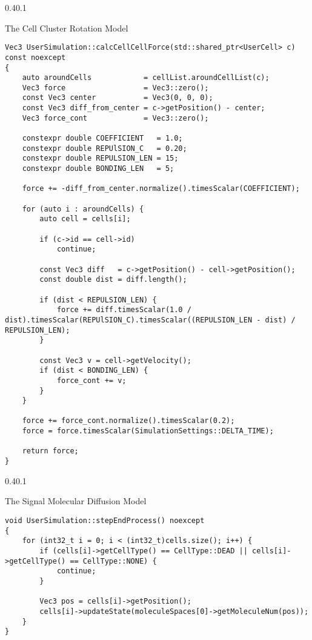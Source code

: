 \documentclass[vipdfmx,a4paper,11pt]{jsarticle}
\makeatletter
\renewcommand{\subsection}{%
  \@startsection{subsection}{1}{\z@}%
  {0.4\Cvs}{0.1\Cvs}%
  {\normalfont\large\headfont\raggedright}}
\renewcommand{\subsubsection}{%
  \@startsection{subsubsection}{1}{\z@}%
  {0.4\Cvs}{0.1\Cvs}%
  {\normalfont\large\headfont\raggedright}}
\makeatother
\begin{document}
\subsubsection{The Cell Cluster Rotation Model}
\begin{lstlisting}[caption=calcCellCellForce()]
Vec3 UserSimulation::calcCellCellForce(std::shared_ptr<UserCell> c) const noexcept
{
    auto aroundCells            = cellList.aroundCellList(c);
    Vec3 force                  = Vec3::zero();
    const Vec3 center           = Vec3(0, 0, 0);
    const Vec3 diff_from_center = c->getPosition() - center;
    Vec3 force_cont             = Vec3::zero();

    constexpr double COEFFICIENT   = 1.0;
    constexpr double REPUlSION_C   = 0.20;
    constexpr double REPULSION_LEN = 15;
    constexpr double BONDING_LEN   = 5;

    force += -diff_from_center.normalize().timesScalar(COEFFICIENT);

    for (auto i : aroundCells) {
        auto cell = cells[i];

        if (c->id == cell->id)
            continue;

        const Vec3 diff   = c->getPosition() - cell->getPosition();
        const double dist = diff.length();

        if (dist < REPULSION_LEN) {
            force += diff.timesScalar(1.0 / dist).timesScalar(REPUlSION_C).timesScalar((REPULSION_LEN - dist) / REPULSION_LEN);
        }

        const Vec3 v = cell->getVelocity();
        if (dist < BONDING_LEN) {
            force_cont += v;
        }
    }

    force += force_cont.normalize().timesScalar(0.2);
    force = force.timesScalar(SimulationSettings::DELTA_TIME);

    return force;
}
\end{lstlisting}

\subsection{The Signal Molecular Diffusion Model}
\begin{lstlisting}[caption=stepEndProcess()]
void UserSimulation::stepEndProcess() noexcept
{
    for (int32_t i = 0; i < (int32_t)cells.size(); i++) {
        if (cells[i]->getCellType() == CellType::DEAD || cells[i]->getCellType() == CellType::NONE) {
            continue;
        }

        Vec3 pos = cells[i]->getPosition();
        cells[i]->updateState(moleculeSpaces[0]->getMoleculeNum(pos));
    }
}
\end{lstlisting}
\end{document}
